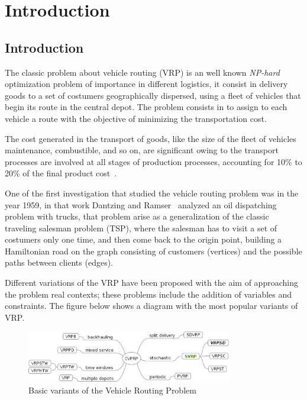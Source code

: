 \chapter{Introduction}
\label{chap:intro}


\section{Introduction}

The classic problem about vehicle routing (VRP) is an well known \textit{NP-hard} ~\cite{Lenstra_1981} optimization problem of importance in different logistics, it consist in delivery goods to a set of costumers geographically dispersed, using a fleet of vehicles that begin its route in the central depot. The problem consists in to assign to each vehicle a route with the objective of minimizing the transportation cost.

The cost generated in the transport of goods, like the size of the fleet of vehicles maintenance, combustible, and so on, are significant owing to the transport processes are involved at all stages of production processes, accounting for 10\% to 20\% of the final product cost~\cite{toth_vehicle_2001}.

One of the first investigation that studied the vehicle routing problem was in the year 1959, in that work Dantzing and Ramser~\cite{Dantzing1959} analyzed an oil dispatching problem with trucks, that problem arise as a generalization of the classic traveling salesman problem (TSP), where the salesman has to visit a set of costumers only one time, and then come back to the origin point, building a Hamiltonian road on the graph consisting of customers (vertices) and the possible paths between clients (edges).

Different variations of the VRP have been proposed with the aim of approaching the problem real contexts; these problems include the addition of variables and constraints. The figure below shows a diagram with the most popular variants of VRP.

\begin{figure}[!htbp]
  \begin{center}
    \includegraphics[width=0.8\textwidth]{Images/Chapter1/variants_vrp.eps}
  \end{center}
  \caption{Basic variants of the Vehicle Routing Problem}
  \label{fig:VRP_variants}
\end{figure}

